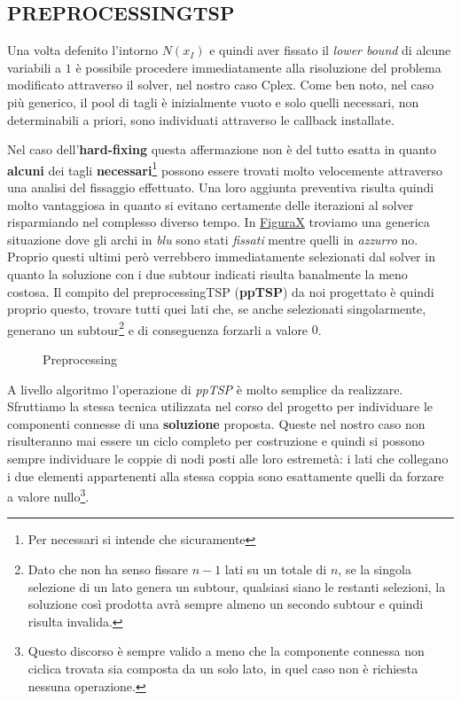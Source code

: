 \documentclass[11pt]{article}
\begin{document}
\subsection*{PREPROCESSINGTSP}

Una volta defenito l'intorno \textbf{$N(x_I)$} e quindi aver fissato il \textit{lower bound} di alcune variabili a $1$ è possibile procedere immediatamente alla risoluzione del problema modificato attraverso il solver, nel nostro caso Cplex. Come ben noto, nel caso più generico, il pool di tagli è inizialmente vuoto e solo quelli necessari, non determinabili a priori, sono individuati attraverso le callback installate.

Nel caso dell'\textbf{hard-fixing} questa affermazione non è del tutto esatta in quanto \textbf{alcuni} dei tagli \textbf{necessari}\footnote{Per necessari si intende che sicuramente } possono essere trovati molto velocemente attraverso una analisi del fissaggio effettuato. Una loro aggiunta preventiva risulta quindi molto vantaggiosa in quanto si evitano certamente delle iterazioni al solver risparmiando nel complesso diverso tempo.
In \hyperref[fig:Preprocessiong1]{FiguraX} troviamo una generica situazione dove gli archi in \textit{blu} sono stati \textit{fissati} mentre quelli in \textit{azzurro} no. Proprio questi ultimi però verrebbero immediatamente selezionati dal solver in quanto la soluzione con i due subtour indicati risulta banalmente la meno costosa. Il compito del preprocessingTSP (\textbf{ppTSP}) da noi progettato è quindi proprio questo, trovare tutti quei lati che, se anche selezionati singolarmente, generano un subtour\footnote{Dato che non ha senso fissare $n-1$ lati su un totale di $n$, se la singola selezione di un lato genera un subtour, qualsiasi siano le restanti selezioni, la soluzione così prodotta avrà sempre almeno un secondo subtour e quindi risulta invalida.} e di conseguenza forzarli a valore $0$.

\begin{figure}[htbp]
    \centering
    \label{fig:Preprocessiong1}
    \caption{Preprocessing}
\end{figure}

A livello algoritmo l'operazione di \textit{ppTSP} è molto semplice da realizzare. Sfruttiamo la stessa tecnica utilizzata nel corso del progetto per individuare le componenti connesse di una \textbf{soluzione} proposta. Queste nel nostro caso non risulteranno mai essere un ciclo completo per costruzione e quindi si possono sempre individuare le coppie di nodi posti alle loro estremetà: i lati che collegano i due elementi appartenenti alla stessa coppia sono esattamente quelli da forzare a valore nullo\footnote{Questo discorso è sempre valido a meno che la componente connessa non ciclica trovata sia composta da un solo lato, in quel caso non è richiesta nessuna operazione.}.
\end{document}
